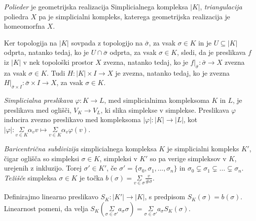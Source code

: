 \documentclass[mat1]{fmfdelo}
\DeclareRobustCommand{\si}{
    \bar{\sigma}
}
\begin{document}
\textit{Polieder} je geometrijska realizacija Simplicialnega kompleksa $|K|$, \textit{triangulacija} poliedra $X$ pa je simplicialni kompleks, katerega geometrijska realizacija je homeomorfna $X$.

Ker topologija na $|K|$ sovpada z topologijo na $\bar{\sigma}$, za vsak $\sigma\in K$ in je $U \subseteq |K|$ odprta, natanko tedaj, ko je $U \cap 
\si$ odprta, za vsak $\sigma \in K$, sledi, da je preslikava $f$ iz $|K|$ v nek topološki prostor $X$ zvezna, natanko tedaj, ko je $f|_{\bar{\sigma}}: \bar{\sigma} \rightarrow X$ zvezna za vsak $\sigma\in K$. Tudi $H:|K|\times I \rightarrow X$ je zvezna, natanko tedaj, ko je zvezna $H|_{\si\times I}:\si\times I \rightarrow X$, za vsak $\sigma\in K$.


\textit{Simplicialna preslikava} $\varphi :K \rightarrow L$, med 
simplicialnima kompleksoma $K$ in $L$, je preslikava med 
oglišči, $V_K \rightarrow V_L$, ki slika simplekse v 
simplekse. Preslikava $\varphi$ inducira zvezno preslikavo med 
kompleksoma $|\varphi| :|K| \rightarrow |L|$, kot $|\varphi|:
\underset{v \in K}{\Sigma}\alpha_v v \mapsto
\underset{v \in K}{\Sigma}\alpha_v \varphi(v)$.

    
\textit{Baricentrična subdivizija} simplicialnega kompleksa 
$K$ je simplicialni kompleks $K'$, čigar oglišča so 
simpleksi $\sigma \in K$, simpleksi v $K'$ so pa verige 
simpleksov v $K$, urejenih z inkluzijo. Torej $\sigma' \in K'$, če $\sigma' = \{\sigma_0, \sigma_1,...,\sigma_n\}$ in $\sigma_0\subsetneq \sigma_1\subsetneq...\subsetneq\sigma_n$. \textit{Težišče} simpleksa $\sigma \in K$ je točka $b(\sigma)=\underset{v\in \sigma}{\Sigma} \frac{v}{\#\sigma}$.

Definirajmo linearno preslikavo $S_K: |K'| \rightarrow |K|$, s predpisom $S_K(\sigma) = b(\sigma)$. Linearnost pomeni, da velja $S_K(\underset{\sigma\in \sigma'}{\Sigma} a_\sigma \sigma) =  \underset{\sigma\in \sigma'}{\Sigma} a_\sigma S_K(\sigma).$
\end{document}

